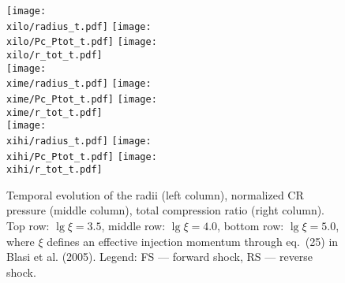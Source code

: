 \documentclass[referee,oldversion]{aa}
\def\basedir{../../ramses/output}
\def\xilo{\basedir/bckreact_b5_n01_E1_M14_t3d3}
\def\xime{\basedir/weakxi4_b5_n01_E1_M14_t3d3}
\def\xihi{\basedir/seedxi5_b5_n01_E1_M14_t3d3}
\begin{document}
  \begin{figure*}[ht]\begin{center}%
        \texttt{[image: \\xilo/radius\_t.pdf]}
        \texttt{[image: \\xilo/Pc\_Ptot\_t.pdf]}
        \texttt{[image: \\xilo/r\_tot\_t.pdf]}\\
        \texttt{[image: \\xime/radius\_t.pdf]}
        \texttt{[image: \\xime/Pc\_Ptot\_t.pdf]}
        \texttt{[image: \\xime/r\_tot\_t.pdf]}\\
        \texttt{[image: \\xihi/radius\_t.pdf]}
        \texttt{[image: \\xihi/Pc\_Ptot\_t.pdf]}
        \texttt{[image: \\xihi/r\_tot\_t.pdf]}\\
        \caption{Temporal evolution of the radii (left column), normalized CR pressure (middle column), total compression ratio (right column). Top row: $\lg{\xi} = 3.5$, middle row: $\lg{\xi} = 4.0$, bottom row: $\lg{\xi} = 5.0$, where $\xi$ defines an effective injection momentum through eq.~(25) in Blasi et al. (2005).  Legend: FS --- forward shock, RS --- reverse shock.}
        \label{evol1}
    \end{center}\end{figure*}


%




%
\end{document}
